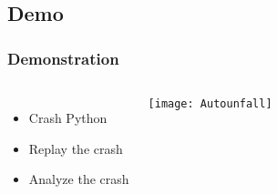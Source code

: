 \subsection{Demo}
\frame
{
    \frametitle{Demonstration}
    \begin{columns}[c]
        \column{2.5in}
            \begin{itemize}
            \item Crash Python
            \item Replay the crash
            \item Analyze the crash
            \end{itemize}

        \column{2.3in}
            \texttt{[image: Autounfall]}
    \end{columns}
}

